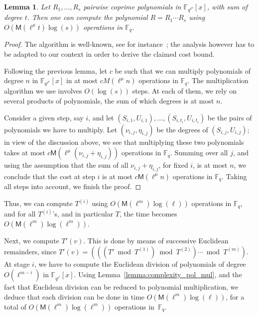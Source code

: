 \documentclass{lms}
\newtheorem{lem}[thm]{Lemma}
\newcommand{\F}{\mathbb{F}}
\begin{document}
\begin{lem} \label{lemma:mul-pol}
  Let $R_1,\dots,R_s$ pairwise coprime polynomials in
  $\F_{q^{\ell^\mu}}[x]$, with sum of degree $t$. Then one can compute the
  polynomial $R=R_1 \cdots R_s$
  using $O(\mathsf{M}(\ell^\mu t) \log(s) )$ operations in $\F_q$.
\end{lem}
\begin{proof}
  The algorithm is well-known, see for
  instance~\cite[Lemma~10.4]{vzGG}; the analysis however has to be
  adapted to our context in order to derive the claimed cost bound.

  Following the previous lemma, let $c$ be such that we can multiply
  polynomials of degree $n$ in $\mathbb{F}_{q^{\ell^\mu}}[x] $ in at
  most $c M(\ell^\mu n)$ operations in $\F_q$. The multiplication
  algorithm we use involves $O(\log(s))$ steps. At each of them, we
  rely on several products of polynomials, the sum of which degrees is
  at most $n$.
  
  Consider a given step, say $i$, and let
  $(S_{i,1},U_{i,1}),\dots,(S_{i,t_i},U_{i,t_i})$ be the pairs of
  polynomials we have to multiply. Let $(\nu_{i,j},\eta_{i,j})$ be the
  degrees of $(S_{i,j},U_{i,j})$; in view of the discussion above, we
  see that multiplying these two polynomials takes at most $c
  \mathsf{M}(\ell^\mu (\nu_{i,j}+\eta_{i,j}))$ operations in
  $\F_q$. Summing over all $j$, and using the assumption that the sum
  of all $\nu_{i,j}+\eta_{i,j}$, for fixed $i$, is at most $n$, we
  conclude that the cost at step $i$ is at most $c \mathsf{M}(\ell^\mu
  n)$ operations in $\F_q$. Taking all steps into account, we finish
  the proof.
\end{proof}

Thus, we can compute $T^{(i)}$ using $O(\mathsf{M}(\ell^m)\log(\ell))$
operations in $\F_q$, and for all $T^{(i)}$'s, and in particular $T$,
the time becomes $O(\mathsf{M}(\ell^m)\log(\ell^m))$.

Next, we compute $T'(v)$. This is done by means of successive
Euclidean remainders, since $T'(v) = (((T' \bmod T^{(1)}) \bmod
T^{(2)}) \cdots \bmod T^{(m)})$.  At stage $i$, we have to compute 
the Euclidean division of polynomials of degree $O(\ell^{m-i})$ 
in $\F_{q^{\ell^i}}[x]$. Using Lemma~\ref{lemma:complexity_pol_mul},
and the fact that Euclidean division can be reduced to polynomial 
multiplication, we deduce that each division can be done in time
$O(\mathsf{M}(\ell^m)\log(\ell))$, for a total of 
$O(\mathsf{M}(\ell^m)\log(\ell^m))$ operations in~$\F_q$.
\end{document}
